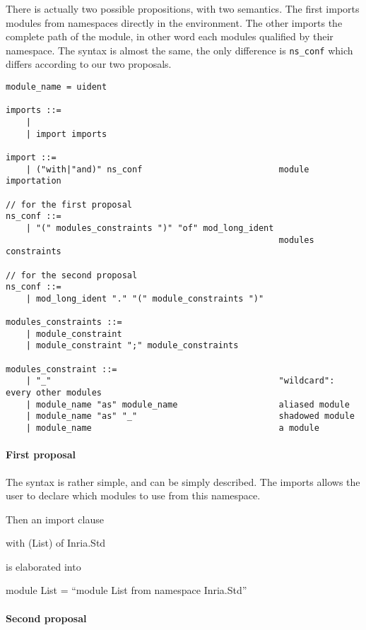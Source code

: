 \medskip

There is actually two possible propositions, with two semantics. The first
imports modules from namespaces directly in the environment. The other imports
the complete path of the module, in other word each modules qualified by their
namespace. The syntax is almost the same, the only difference is
\texttt{ns\_conf} which differs according to our two proposals. 


\begin{verbatim}
module_name = uident

imports ::=
    | 
    | import imports 

import ::=
    | ("with|"and)" ns_conf                           module importation    

// for the first proposal
ns_conf ::=
    | "(" modules_constraints ")" "of" mod_long_ident 
                                                      modules constraints

// for the second proposal
ns_conf ::=
    | mod_long_ident "." "(" module_constraints ")"

modules_constraints ::=
    | module_constraint
    | module_constraint ";" module_constraints

modules_constraint ::=
    | "_"                                             "wildcard": every other modules
    | module_name "as" module_name                    aliased module
    | module_name "as" "_"                            shadowed module
    | module_name                                     a module
\end{verbatim}

\paragraph{First proposal}

The syntax is rather simple, and can be simply described. The imports allows the
user to declare which modules to use from this namespace. 

Then an import clause
\begin{OCaml}
with (List) of Inria.Std
\end{OCaml}
is elaborated into
\begin{OCaml}
module List = ``module List from namespace Inria.Std''
\end{OCaml}

\paragraph{Second proposal}

